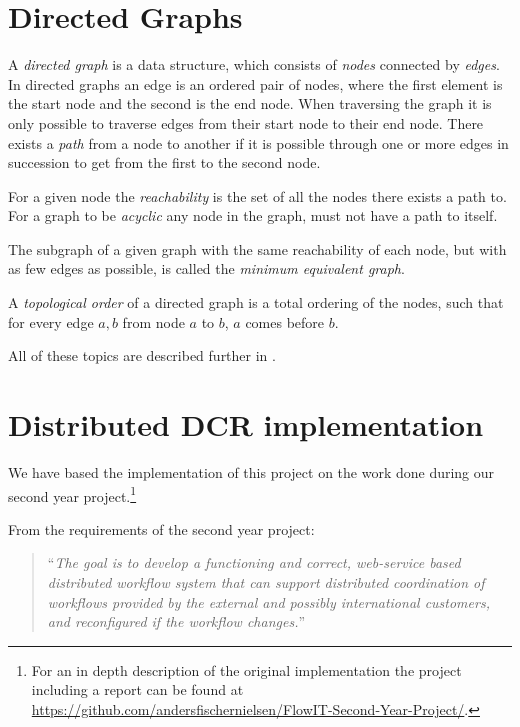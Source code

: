 	\section{Directed Graphs}
		A \textit{directed graph} is a data structure, which consists of \textit{nodes} connected by \textit{edges}. In directed graphs an edge is an ordered pair of nodes, where the first element is the start node and the second is the end node. When traversing the graph it is only possible to traverse edges from their start node to their end node. There exists a \textit{path} from a node to another if it is possible through one or more edges in succession to get from the first to the second node.
	
		For a given node the \textit{reachability} is the set of all the nodes there exists a path to. For a graph to be \textit{acyclic} any node in the graph, must not have a path to itself. 
	
		The subgraph of a given graph with the same reachability of each node, but with as few edges as possible, is called the \textit{minimum equivalent graph}.
	
		A \textit{topological order} of a directed graph is a total ordering of the nodes, such that for every edge $a,b$ from node $a$ to $b$, $a$ comes before $b$.
		
		\newpar All of these topics are described further in \cite{sedgewick2011algorithms}.
		
	\section{Distributed DCR implementation}\label{sec:background:implementation}
		We have based the implementation of this project on the work done during our second year project.\footnote{For an in depth description of the original implementation the project including a report can be found at \url{https://github.com/andersfischernielsen/FlowIT-Second-Year-Project/}.}
		
		\newpar From the requirements of the second year project:
		
		\begin{quotation}
			\noindent``\textit{The goal is to develop a functioning and correct, web-service based distributed workflow system that can support distributed coordination of workflows provided by the external and possibly international customers, and reconfigured if the workflow changes.}''
		\end{quotation}
		
